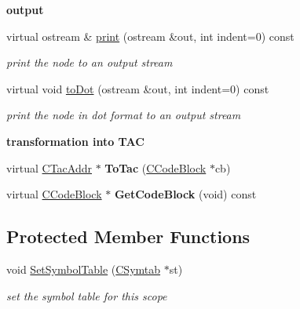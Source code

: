 \begin{Indent}{\bf output}\par
\begin{DoxyCompactItemize}
\item 
virtual ostream \& \hyperlink{classCAstScope_a8551aa71a45c81210a99485bac50282e}{print} (ostream \&out, int indent=0) const 
\begin{DoxyCompactList}\small\item\em print the node to an output stream \end{DoxyCompactList}\item 
virtual void \hyperlink{classCAstScope_a6c8da437acaf4cbed4f7747a89096e29}{to\-Dot} (ostream \&out, int indent=0) const 
\begin{DoxyCompactList}\small\item\em print the node in dot format to an output stream \end{DoxyCompactList}\end{DoxyCompactItemize}
\end{Indent}
\begin{Indent}{\bf transformation into T\-A\-C}\par
\begin{DoxyCompactItemize}
\item 
\hypertarget{classCAstScope_aecc3eb358d7ee44815814a2f3105e48c}{virtual \hyperlink{classCTacAddr}{C\-Tac\-Addr} $\ast$ {\bfseries To\-Tac} (\hyperlink{classCCodeBlock}{C\-Code\-Block} $\ast$cb)}\label{classCAstScope_aecc3eb358d7ee44815814a2f3105e48c}

\item 
\hypertarget{classCAstScope_a65b5405ecf261fcf5816a337344c624f}{virtual \hyperlink{classCCodeBlock}{C\-Code\-Block} $\ast$ {\bfseries Get\-Code\-Block} (void) const }\label{classCAstScope_a65b5405ecf261fcf5816a337344c624f}

\end{DoxyCompactItemize}
\end{Indent}
\subsection*{Protected Member Functions}
\begin{DoxyCompactItemize}
\item 
\hypertarget{classCAstScope_a0fd1fc660b77fc92cf0ed6f366ef0783}{void \hyperlink{classCAstScope_a0fd1fc660b77fc92cf0ed6f366ef0783}{Set\-Symbol\-Table} (\hyperlink{classCSymtab}{C\-Symtab} $\ast$st)}\label{classCAstScope_a0fd1fc660b77fc92cf0ed6f366ef0783}

\begin{DoxyCompactList}\small\item\em set the symbol table for this scope \end{DoxyCompactList}\end{DoxyCompactItemize}

